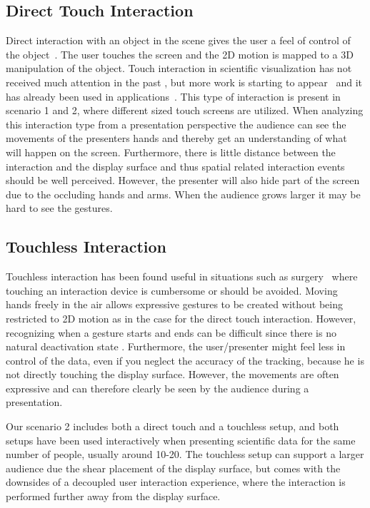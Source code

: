\documentclass[review,journal]{vgtc}         %
\begin{document}
\subsection{Direct Touch Interaction}
Direct interaction with an object in the scene gives the user a feel of control of the object~\cite{isenberg2009studying}. 
The user touches the screen and the 2D motion is mapped to a 3D manipulation of the object. 
Touch interaction in scientific visualization has not received much attention in the past \cite{isenberg:hal-00781512}, 
but more work is starting to appear~\cite{Klein:2012:DSD:2322389.2322403} and it has already been used in applications~\cite{LRFPY11}.
This type of interaction is present in scenario 1 and 2, where different sized touch screens are utilized. 
When analyzing this interaction type from a presentation perspective the audience can see the movements of the presenters hands and thereby get an understanding of what will happen on the screen.
Furthermore, there is little distance between the interaction and the display surface and thus spatial related interaction events should be well perceived.
However, the presenter will also hide part of the screen due to the occluding hands and arms. 
When the audience grows larger it may be hard to see the gestures.


\subsection{Touchless Interaction}
Touchless interaction has been found useful in situations such as surgery~\cite{Mentis:2012:IPI:2207676.2208536} where touching an interaction device is cumbersome or should be avoided.
Moving hands freely in the air allows expressive gestures to be created without being restricted to 2D motion as in the case for the direct touch interaction. However, recognizing when a gesture starts and ends can be difficult since there is no natural deactivation state \cite{Kirmizibayrak:2011:EGB:2087756.2087764}. Furthermore, the user/presenter might feel less in control of the data, even if you neglect the accuracy of the tracking, because he is not directly touching the display surface. However, the movements are often expressive and can therefore clearly be seen by the audience during a presentation.

Our scenario 2 includes both a direct touch and a touchless setup, and both setups have been used interactively when presenting scientific data for the same number of people, usually around 10-20. The touchless setup can support a larger audience due the shear placement of the display surface, but comes with the downsides of a decoupled user interaction experience, where the interaction is performed further away from the display surface.
\end{document}
